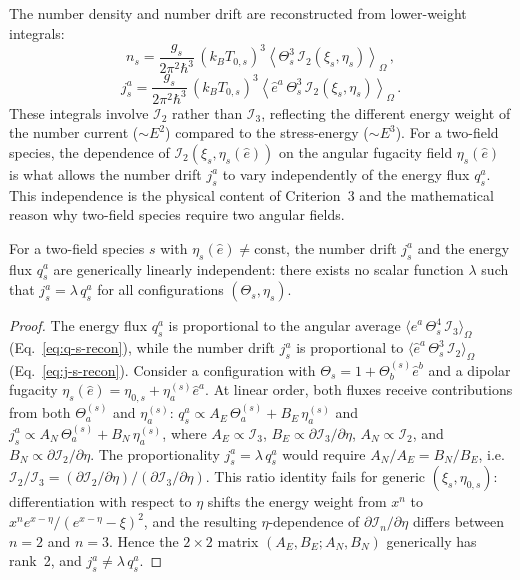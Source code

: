 The number density and number drift are reconstructed
from lower-weight integrals:
\begin{equation}\label{eq:n-s-recon}
n_s
= \frac{g_s}{2\pi^2\hbar^3}\,(k_B T_{0,s})^3
  \left\langle \Theta_s^3\,
  \mathcal{I}_2(\xi_s, \eta_s)
  \right\rangle_\Omega\,,
\end{equation}
\begin{equation}\label{eq:j-s-recon}
j_s^a
= \frac{g_s}{2\pi^2\hbar^3}\,(k_B T_{0,s})^3
  \left\langle \hat{e}^a\, \Theta_s^3\,
  \mathcal{I}_2(\xi_s, \eta_s)
  \right\rangle_\Omega\,.
\end{equation}
These integrals involve $\mathcal{I}_2$ rather than
$\mathcal{I}_3$, reflecting the different energy
weight of the number current ($\sim E^2$) compared to
the stress-energy ($\sim E^3$).  For a two-field
species, the dependence of $\mathcal{I}_2(\xi_s,
\eta_s(\hat{e}))$ on the angular fugacity field
$\eta_s(\hat{e})$ is what allows the number drift
$j_s^a$ to vary independently of the energy flux
$q_s^a$.  This independence is the physical content of
Criterion~3 and the mathematical reason why two-field
species require two angular fields.

\begin{proposition}
\label{prop:flux-independence}
For a two-field species $s$ with $\eta_s(\hat{e})
\neq \text{const}$, the number drift $j_s^a$ and the
energy flux $q_s^a$ are generically linearly
independent: there exists no scalar function
$\lambda$ such that $j_s^a = \lambda\, q_s^a$ for all
configurations $(\Theta_s, \eta_s)$.
\end{proposition}

\begin{proof}
The energy flux $q_s^a$ is proportional to the angular
average $\langle \hat{e}^a\, \Theta_s^4\,
\mathcal{I}_3 \rangle_\Omega$
(Eq.~\ref{eq:q-s-recon}), while the number drift
$j_s^a$ is proportional to
$\langle \hat{e}^a\, \Theta_s^3\,
\mathcal{I}_2 \rangle_\Omega$
(Eq.~\ref{eq:j-s-recon}).  Consider a configuration
with $\Theta_s = 1 + \Theta^{(s)}_b \hat{e}^b$ and a
dipolar fugacity $\eta_s(\hat{e}) = \eta_{0,s} +
\eta^{(s)}_a \hat{e}^a$.  At linear order, both fluxes
receive contributions from both $\Theta^{(s)}_a$ and
$\eta^{(s)}_a$:
$q_s^a \propto A_E\,\Theta^{(s)}_a
+ B_E\,\eta^{(s)}_a$ and
$j_s^a \propto A_N\,\Theta^{(s)}_a
+ B_N\,\eta^{(s)}_a$,
where $A_E \propto \mathcal{I}_3$,
$B_E \propto \partial\mathcal{I}_3/\partial\eta$,
$A_N \propto \mathcal{I}_2$, and
$B_N \propto \partial\mathcal{I}_2/\partial\eta$.
The proportionality $j_s^a = \lambda\,q_s^a$ would
require $A_N/A_E = B_N/B_E$, i.e.\
$\mathcal{I}_2/\mathcal{I}_3
= (\partial\mathcal{I}_2/\partial\eta)
 /(\partial\mathcal{I}_3/\partial\eta)$.
This ratio identity fails for generic
$(\xi_s, \eta_{0,s})$: differentiation with respect to
$\eta$ shifts the energy weight from $x^n$ to
$x^n e^{x-\eta}/(e^{x-\eta}-\xi)^2$, and the
resulting $\eta$-dependence of
$\partial\mathcal{I}_n/\partial\eta$ differs between
$n = 2$ and $n = 3$.  Hence the $2 \times 2$ matrix
$(A_E, B_E; A_N, B_N)$ generically has rank~2, and
$j_s^a \neq \lambda\,q_s^a$.
\end{proof}


